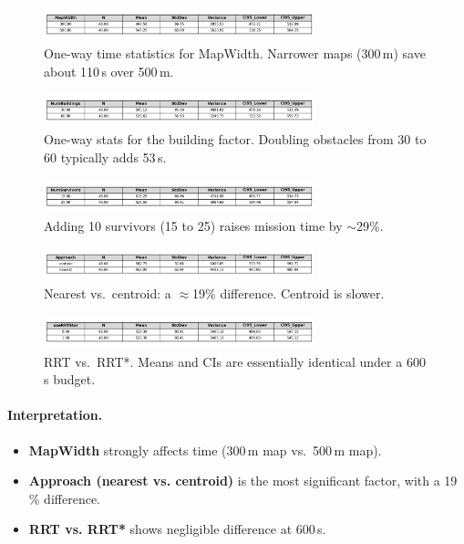 \documentclass[12pt,a4paper]{report}
\begin{document}
\begin{figure}[H]
\centering
\includegraphics[width=0.7\textwidth]{analysis/MapWidth_time_stats.png}
\caption{One-way time statistics for MapWidth. Narrower maps (300\,m) save about 110\,s over 500\,m.}
\label{fig:mapwidthstats}
\end{figure}

\begin{figure}[H]
\centering
\includegraphics[width=0.7\textwidth]{analysis/NumBuildings_time_stats.png}
\caption{One-way stats for the building factor. Doubling obstacles from 30 to 60 typically adds 53\,s.}
\end{figure}

\begin{figure}[H]
\centering
\includegraphics[width=0.7\textwidth]{analysis/NumSurvivors_time_stats.png}
\caption{Adding 10 survivors (15 to 25) raises mission time by \(\sim\)29\%.}
\end{figure}

\begin{figure}[H]
\centering
\includegraphics[width=0.7\textwidth]{analysis/Approach_time_stats.png}
\caption{Nearest vs.\ centroid: a \(\approx\)19\% difference. Centroid is slower.}
\label{fig:approachstats}
\end{figure}

\begin{figure}[H]
\centering
\includegraphics[width=0.7\textwidth]{analysis/useRRTStar_time_stats.png}
\caption{RRT vs.\ RRT*. Means and CIs are essentially identical under a 600\,s budget.}
\end{figure}


\paragraph{Interpretation.}  
\begin{itemize}
\item \textbf{MapWidth} strongly affects time (300\,m map vs.\ 500\,m map).  
\item \textbf{Approach (nearest vs. centroid)} is the most significant factor, 
  with a 19\,\% difference.  
\item \textbf{RRT vs. RRT*} shows negligible difference at 600\,s.  
\end{itemize}
\end{document}
